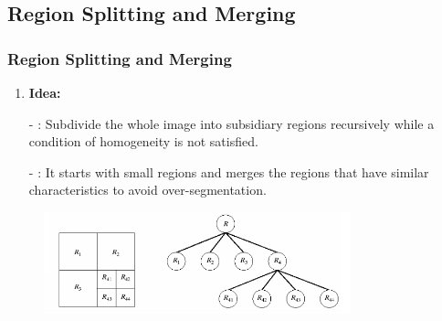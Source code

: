 \documentclass[notheorems,mathserif,table,compress]{beamer}  %
\begin{document}

\subsection{Region Splitting and Merging}
\begin{frame}
    \frametitle{Region Splitting and Merging}
    \begin{enumerate}[{\color{black}{\Large (A)}}]
    \item  \textbf{\Large Idea:}
    \end{enumerate}
    \begin{itemize}
    \item[-] {\color{blue}{Splitting}}: Subdivide the whole image into subsidiary regions recursively while a condition of homogeneity is not satisfied.%
    \end{itemize}
    \begin{itemize}
    \item[-] {\color{blue}{Merging}}: It starts with small regions and merges the regions that have similar characteristics to avoid over-segmentation.%
    \end{itemize}
  \begin{figure}[!ht]
  \centering\includegraphics[width=3.5in]{tree3.png}
  \end{figure}
\end{frame}
\end{document}
